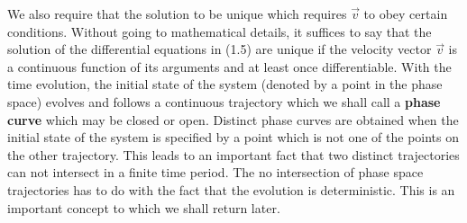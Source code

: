 We also require that the solution to be unique which requires $\vec{v}$ to obey certain conditions. Without going to mathematical details, it suffices to say that the solution of the differential equations in (1.5) are unique if the velocity vector $\vec{v}$ is a continuous function of its arguments and at least once differentiable. With the time evolution, the initial state of the system (denoted by a point in the phase space) evolves and follows a continuous trajectory which we shall call a \textbf{phase curve} which may be closed or open. Distinct phase curves are obtained when the initial state of the system is specified by a point which is not one of the points on the other trajectory. This leads to an important fact that two distinct trajectories can not intersect in a finite time period. The no intersection of phase space trajectories has to do with the fact that the evolution is deterministic. This is an important concept to which we shall return later.
